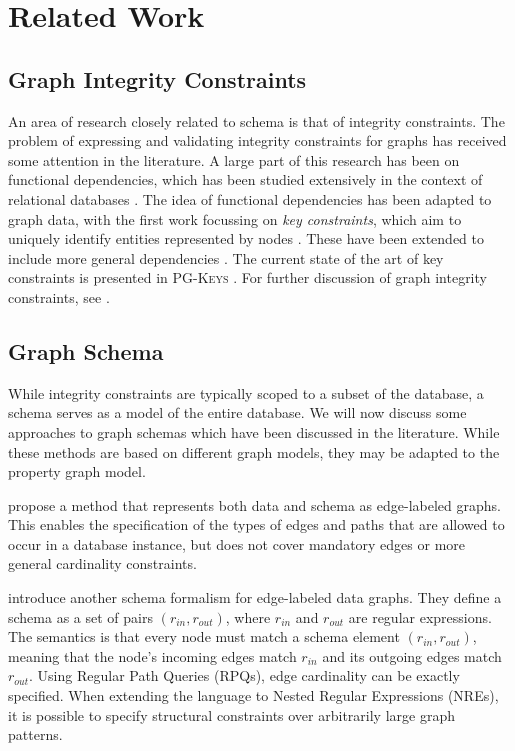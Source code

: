\documentclass{report}
\theoremstyle{definition}
\begin{document}
\chapter{Related Work}
\label{ch:related-work}

\section{Graph Integrity Constraints}

An area of research closely related to schema is that of integrity constraints. The problem of expressing and validating integrity constraints for graphs has received some attention in the literature. A large part of this research has been on functional dependencies, which has been studied extensively in the context of relational databases \citep{fagin1984theory,abiteboul1999data}. The idea of functional dependencies has been adapted to graph data, with the first work focussing on \emph{key constraints}, which aim to uniquely identify entities represented by nodes \citep{fan2015keys}. These have been extended to include more general dependencies \citep{fan2016functional}. The current state of the art of key constraints is presented in \textsc{PG-Keys} \citep{angles2021keys}. For further discussion of graph integrity constraints, see \citet{bonifati2018querying}.

\section{Graph Schema}

While integrity constraints are typically scoped to a subset of the database, a schema serves as a model of the entire database. We will now discuss some approaches to graph schemas which have been discussed in the literature. While these methods are based on different graph models, they may be adapted to the property graph model.

\citet{buneman1997adding} propose a method that represents both data and schema as edge-labeled graphs. This enables the specification of the types of edges and paths that are allowed to occur in a database instance, but does not cover mandatory edges or more general cardinality constraints.

\citet{colazzo2015typing} introduce another schema formalism for edge-labeled data graphs. They define a schema as a set of pairs $(r_{in}, r_{out})$, where $r_{in}$ and $r_{out}$ are regular expressions. The semantics is that every node must match a schema element $(r_{in}, r_{out})$, meaning that the node's incoming edges match $r_{in}$ and its outgoing edges match $r_{out}$. Using Regular Path Queries (RPQs), edge cardinality can be exactly specified. When extending the language to Nested Regular Expressions (NREs), it is possible to specify structural constraints over arbitrarily large graph patterns.
\end{document}
